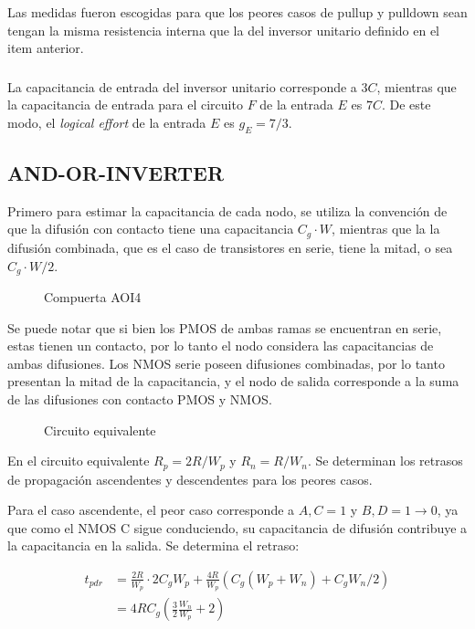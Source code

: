 \documentclass[letterpaper, 12pt]{article}
\numberwithin{equation}{section}
\begin{document}
Las medidas fueron escogidas para que los peores casos de pullup y pulldown sean tengan la misma resistencia interna que la del inversor unitario definido en el item anterior.

\subsubsection{}

La capacitancia de entrada del inversor unitario corresponde a \(3C\), mientras que la capacitancia de entrada para el circuito \(F\) de la entrada \(E\) es \(7C\). De este modo, el \emph{logical effort} de la entrada \(E\) es \(g_E = 7/3\).

\subsection{AND-OR-INVERTER}

Primero para estimar la capacitancia de cada nodo, se utiliza la convención de que la difusión con contacto tiene una capacitancia \(C_g\cdot W\), mientras que la la difusión combinada, que es el caso de transistores en serie, tiene la mitad, o sea \(C_g\cdot W/2\).

\begin{figure}[H]
  \centering
  
  \caption{Compuerta AOI4}
\end{figure}

Se puede notar que si bien los PMOS de ambas ramas se encuentran en serie, estas tienen un contacto, por lo tanto el nodo considera las capacitancias de ambas difusiones. Los NMOS serie poseen difusiones combinadas, por lo tanto presentan la mitad de la capacitancia, y el nodo de salida corresponde a la suma de las difusiones con contacto PMOS y NMOS.

\begin{figure}[H]
  \centering
  
  \caption{Circuito equivalente}
\end{figure}

En el circuito equivalente \(R_p = 2R/W_p\) y \(R_n = R/W_n\). Se determinan los retrasos de propagación ascendentes y descendentes para los peores casos.

Para el caso ascendente, el peor caso corresponde a \(A,C=1\) y \(B,D=1\rightarrow 0\), ya que como el NMOS C sigue conduciendo, su capacitancia de difusión contribuye a la capacitancia en la salida. Se determina el retraso:

\begin{align}
  t_{pdr} &= \frac{2R}{W_p}\cdot 2C_gW_p + \frac{4R}{W_p}\left( C_g(W_p+W_n) + C_gW_n/2 \right) \\
          &= 4RC_g\left( \frac{3}{2}\frac{W_n}{W_p}+2 \right)
\end{align}
\end{document}
